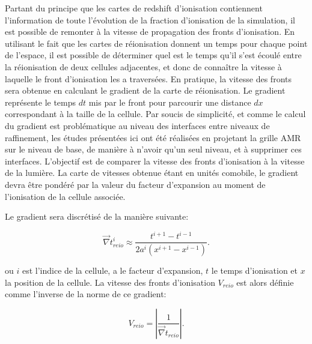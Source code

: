 Partant du principe que les cartes de redshift d'ionisation contiennent l'information de toute l'évolution de la fraction d'ionisation de la simulation, il est possible de remonter à la vitesse de propagation des fronts d'ionisation.
En utilisant le fait que les cartes de réionisation donnent un temps pour chaque point de l'espace, il est possible de déterminer quel est le temps qu'il s'est écoulé entre la réionisation de deux cellules adjacentes, et donc de connaître la vitesse à laquelle le front d'ionisation les a traversées.
En pratique, la vitesse des fronts sera obtenue en calculant le gradient de la carte de réionisation.
Le gradient représente le temps $dt$ mis par le front pour parcourir une distance $dx$ correspondant à la taille de la cellule.
Par soucis de simplicité, et comme le calcul du gradient est problématique au niveau des interfaces entre niveaux de raffinement, les études présentées ici ont été réalisées en projetant la grille \ac{AMR} sur le niveau de base, de manière à n'avoir qu'un seul niveau, et à supprimer ces interfaces.
L'objectif est de comparer la vitesse des fronts d'ionisation à la vitesse de la lumière.
La carte de vitesses obtenue étant en unités comobile, le gradient devra être pondéré par la valeur du facteur d'expansion au moment de l'ionisation de la cellule associée.

Le gradient sera discrétisé de la manière suivante:

\begin{equation}
\vec{\nabla} t_{reio}^i \approx \frac{t^{i+1}  - t^{i-1}}{2a^i \left( x^{i+1}  - x^{i-1} \right)}.
\end{equation}

ou $i$ est l'indice de la cellule, a le facteur d'expansion, $t$ le temps d'ionisation et $x$  la position de la cellule.
La vitesse des fronts d'ionisation $V_{reio}$ est alors définie comme l'inverse de la norme de ce gradient:

\begin{equation}
V_{reio}  = \left | \frac{1}{ \vec{\nabla} t_{reio}} \right| .
\end{equation}

